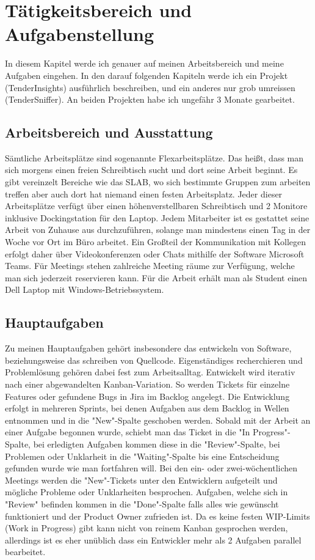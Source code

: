 \chapter{Tätigkeitsbereich und Aufgabenstellung}
In diesem Kapitel werde ich genauer auf meinen Arbeitsbereich und meine Aufgaben eingehen.
In den darauf folgenden Kapiteln werde ich ein Projekt (TenderInsights) ausführlich beschreiben, und ein anderes nur
grob umreissen (TenderSniffer). An beiden Projekten habe ich ungefähr 3 Monate gearbeitet.

\section{Arbeitsbereich und Ausstattung}
Sämtliche Arbeitsplätze sind sogenannte Flexarbeitsplätze. Das heißt, dass man sich morgens einen freien Schreibtisch sucht und dort seine Arbeit beginnt. 
Es gibt vereinzelt Bereiche wie das SLAB, wo sich bestimmte Gruppen zum arbeiten treffen aber auch dort hat niemand einen festen Arbeitsplatz. 
Jeder dieser Arbeitsplätze verfügt über einen höhenverstellbaren Schreibtisch und 2 Monitore inklusive Dockingstation für den Laptop. 
Jedem Mitarbeiter ist es gestattet seine Arbeit von Zuhause aus durchzuführen, solange man mindestens einen Tag in der Woche vor Ort im Büro arbeitet. 
Ein Großteil der Kommunikation mit Kollegen erfolgt daher über Videokonferenzen oder Chats mithilfe der Software Microsoft Teams. 
Für Meetings stehen zahlreiche Meeting räume zur Verfügung, welche man sich jederzeit reservieren kann.
Für die Arbeit erhält man als Student einen Dell Laptop mit Windows-Betriebssystem. 


\section{Hauptaufgaben}
Zu meinen Hauptaufgaben gehört insbesondere das entwickeln von Software, beziehungsweise das schreiben von Quellcode. Eigenständiges recherchieren und Problemlösung gehören dabei fest zum Arbeitsalltag.
Entwickelt wird iterativ nach einer abgewandelten Kanban-Variation. So werden Tickets für einzelne Features oder gefundene Bugs in Jira im Backlog angelegt. Die Entwicklung erfolgt in mehreren Sprints,
bei denen Aufgaben aus dem Backlog in Wellen entnommen und in die "New"-Spalte geschoben werden. Sobald mit der Arbeit an einer Aufgabe begonnen wurde, schiebt man das Ticket in die "In Progress"-Spalte, 
bei erledigten Aufgaben kommen diese in die "Review"-Spalte, bei Problemen oder Unklarheit in die "Waiting"-Spalte bis eine Entscheidung gefunden wurde wie man fortfahren will.
Bei den ein- oder zwei-wöchentlichen Meetings werden die "New"-Tickets unter den Entwicklern aufgeteilt und mögliche Probleme oder Unklarheiten besprochen. Aufgaben, welche sich in "Review" befinden 
kommen in die "Done"-Spalte falls alles wie gewünscht funktioniert und der Product Owner zufrieden ist. Da es keine festen WIP-Limits (Work in Progress) gibt kann nicht von reinem Kanban gesprochen werden, 
allerdings ist es eher unüblich dass ein Entwickler mehr als 2 Aufgaben parallel bearbeitet.


